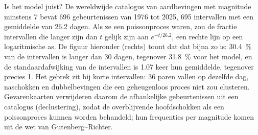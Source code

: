 Is het model juist? De wereldwijde catalogus van aardbevingen met magnitude minstens 7 bevat 696 gebeurtenissen
van 1976 tot 2025, 695 intervallen met een gemiddelde van 26.2 dagen. Als ze een poissonproces waren,
zou de fractie intervallen die langer zijn dan $t$ gelijk zijn aan $e^{-t/26.2}$, een rechte lijn op een logaritmische
as. De figuur hieronder (rechts) toont dat dat bijna zo is: \qty{30.4}{\percent} van de intervallen is
langer dan 30 dagen, tegenover \qty{31.8}{\percent} voor het model, en de standaardafwijking van de
intervallen is 1.07 keer hun gemiddelde, tegenover precies 1. Het gebrek zit bij korte intervallen: 36 paren
vallen op dezelfde dag, naschokken en dubbelbevingen die een geheugenloos proces niet zou clusteren.
Gevarenkaarten verwijderen daarom de afhankelijke gebeurtenissen uit een catalogus (declustering), zodat de
overblijvende hoofdschokken als een poissonproces kunnen worden behandeld; hun frequenties per magnitude komen uit de
wet van Gutenberg--Richter.

